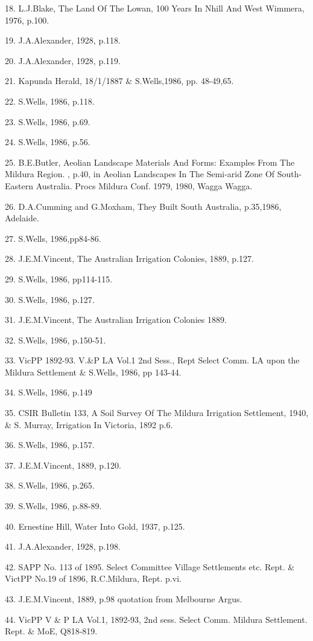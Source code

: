 18. L.J.Blake, The Land Of The Lowan, 100 Years In Nhill And West 
     Wimmera, 1976, p.100.

19. J.A.Alexander, 1928, p.118.

20. J.A.Alexander, 1928, p.119.

21. Kapunda Herald, 18/1/1887 \&  S.Wells,1986, pp. 48-49,65.

22. S.Wells, 1986, p.118.

23. S.Wells, 1986, p.69.

24. S.Wells, 1986, p.56.

25. B.E.Butler, Aeolian Landscape Materials And Forms: Examples From The
      Mildura Region. , p.40, in Aeolian Landscapes In The Semi-arid Zone Of
      South-Eastern Australia. Procs Mildura Conf. 1979, 1980, Wagga Wagga.   

26. D.A.Cumming and G.Moxham, They Built South Australia, p.35,1986, 
      Adelaide.

27. S.Wells, 1986,pp84-86.

28. J.E.M.Vincent, The Australian Irrigation Colonies, 1889, p.127.

29. S.Wells, 1986, pp114-115.

30. S.Wells, 1986, p.127.

31. J.E.M.Vincent, The Australian Irrigation Colonies 1889. 

32. S.Wells, 1986, p.150-51.

33. VicPP 1892-93. V.\&P LA Vol.1 2nd Sess., Rept Select Comm.
      LA upon the Mildura Settlement \& S.Wells, 1986, pp 143-44.

34. S.Wells, 1986, p.149

35. CSIR Bulletin 133, A Soil Survey Of The Mildura Irrigation Settlement,
      1940, \& S. Murray, Irrigation In Victoria, 1892 p.6.

36. S.Wells, 1986, p.157.

37. J.E.M.Vincent, 1889, p.120.

38. S.Wells, 1986, p.265.

39. S.Wells, 1986, p.88-89.

40. Ernestine Hill, Water Into Gold, 1937, p.125.

41. J.A.Alexander, 1928, p.198.

42. SAPP No. 113 of 1895. Select Committee Village Settlements etc. Rept.
      \&  VictPP No.19 of 1896, R.C.Mildura, Rept. p.vi.

43.  J.E.M.Vincent, 1889, p.98 quotation from Melbourne Argus.

44. VicPP V \& P LA Vol.1, 1892-93, 2nd sess. Select Comm. 
       Mildura Settlement. Rept. \& MoE, Q818-819.

